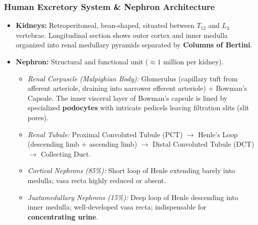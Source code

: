 \documentclass[11pt,a4paper]{article}
\begin{document}
\subsubsection{Human Excretory System \& Nephron Architecture}
\begin{itemize}[leftmargin=1.5em, itemsep=2pt]
  \item \textbf{Kidneys:} Retroperitoneal, bean-shaped, situated between $T_{12}$ and $L_3$ vertebrae. Longitudinal section shows outer cortex and inner medulla organized into renal medullary pyramids separated by \textbf{Columns of Bertini}.
  \item \textbf{Nephron:} Structural and functional unit ($\approx 1\text{ million}$ per kidney).
  \begin{itemize}[label=$\circ$]
    \item \textit{Renal Corpuscle (Malpighian Body):} Glomerulus (capillary tuft from afferent arteriole, draining into narrower efferent arteriole) + Bowman's Capsule. The inner visceral layer of Bowman's capsule is lined by specialized \textbf{podocytes} with intricate pedicels leaving filtration slits (slit pores).
    \item \textit{Renal Tubule:} Proximal Convoluted Tubule (PCT) $\to$ Henle's Loop (descending limb + ascending limb) $\to$ Distal Convoluted Tubule (DCT) $\to$ Collecting Duct.
    \item \textit{Cortical Nephrons (85\%):} Short loop of Henle extending barely into medulla; vasa recta highly reduced or absent.
    \item \textit{Juxtamedullary Nephrons (15\%):} Deep loop of Henle descending into inner medulla; well-developed vasa recta; indispensable for \textbf{concentrating urine}.
  \end{itemize}
\end{itemize}
\end{document}
